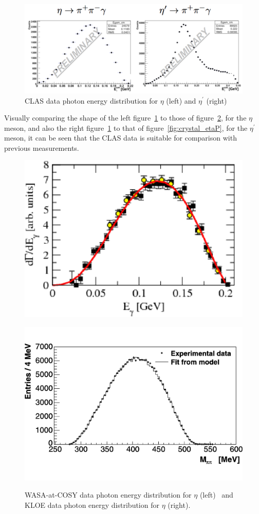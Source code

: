 \documentclass{aip-cp}
\begin{document}
\begin{figure}[h]
	\centerline{\includegraphics[width=350pt]{figures/Box_CLAS.pdf}}
	\caption{CLAS data photon energy distribution for $\eta$ (left) and $\eta^{\prime}$ (right)}
	\label{fig:boxCLAS}
\end{figure}
Visually comparing the shape of the left figure~\ref{fig:boxCLAS} to those of figure~\ref{fig:kloe_eta}, for the  $\eta$ meson, and also the right figure~\ref{fig:boxCLAS} to that of figure~\ref{fig:crystal_etaP}, for the $\eta^{\prime}$ meson, it can be seen that the CLAS data is suitable for comparison with previous measurements.
\begin{figure}[h!]
	\begin{minipage}{.5\textwidth}
		\centering
		\centerline{\includegraphics[width=175 pt]{figures/WASA_eta.pdf}}
		\caption{}{}
		\label{fig:wasa_eta}
	\end{minipage}%
	\begin{minipage}{.5\textwidth}
		\centering
		\centerline{\includegraphics[width=200 pt, height = 150 pt]{figures/KLOE_eta.pdf}}
		\caption{WASA-at-COSY data photon energy distribution for $\eta$ (left)~\cite{bib3} and KLOE data photon energy distribution for $\eta$ (right)\cite{bib2}.}{}
		\label{fig:kloe_eta}
	\end{minipage}
\end{figure}
\end{document}
